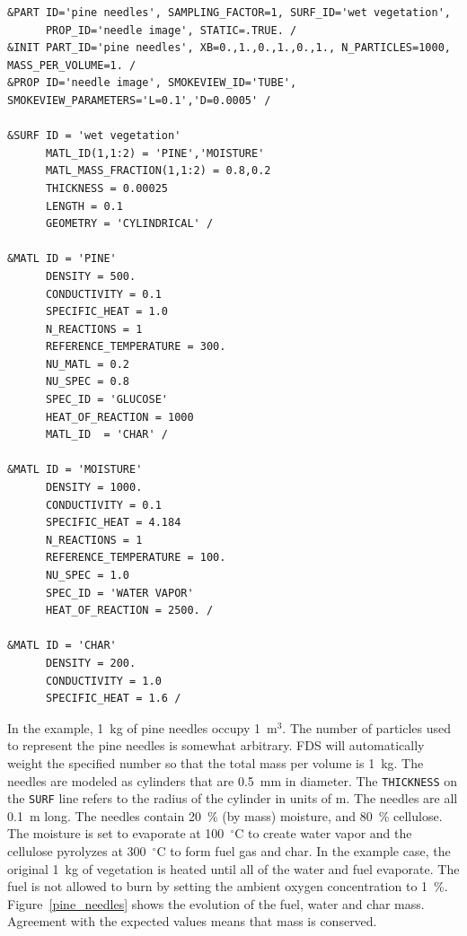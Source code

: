 \documentclass[11pt]{book}
\newcommand{\ct}{\tt\small}
\begin{document}
\footnotesize
\begin{verbatim}
&PART ID='pine needles', SAMPLING_FACTOR=1, SURF_ID='wet vegetation',
      PROP_ID='needle image', STATIC=.TRUE. /
&INIT PART_ID='pine needles', XB=0.,1.,0.,1.,0.,1., N_PARTICLES=1000, MASS_PER_VOLUME=1. /
&PROP ID='needle image', SMOKEVIEW_ID='TUBE', SMOKEVIEW_PARAMETERS='L=0.1','D=0.0005' /

&SURF ID = 'wet vegetation'
      MATL_ID(1,1:2) = 'PINE','MOISTURE'
      MATL_MASS_FRACTION(1,1:2) = 0.8,0.2
      THICKNESS = 0.00025
      LENGTH = 0.1
      GEOMETRY = 'CYLINDRICAL' /

&MATL ID = 'PINE'
      DENSITY = 500.
      CONDUCTIVITY = 0.1
      SPECIFIC_HEAT = 1.0
      N_REACTIONS = 1
      REFERENCE_TEMPERATURE = 300.
      NU_MATL = 0.2
      NU_SPEC = 0.8
      SPEC_ID = 'GLUCOSE'
      HEAT_OF_REACTION = 1000
      MATL_ID  = 'CHAR' /

&MATL ID = 'MOISTURE'
      DENSITY = 1000.
      CONDUCTIVITY = 0.1
      SPECIFIC_HEAT = 4.184
      N_REACTIONS = 1
      REFERENCE_TEMPERATURE = 100.
      NU_SPEC = 1.0
      SPEC_ID = 'WATER VAPOR'
      HEAT_OF_REACTION = 2500. /

&MATL ID = 'CHAR'
      DENSITY = 200.
      CONDUCTIVITY = 1.0
      SPECIFIC_HEAT = 1.6 /
\end{verbatim}
\normalsize

\noindent In the example, 1~kg of pine needles occupy 1~m$^3$. The number of particles used to represent the pine needles is somewhat arbitrary. FDS will automatically weight the specified number so that the total mass per volume is 1~kg. The needles are modeled as cylinders that are 0.5~mm in diameter. The {\ct THICKNESS} on the {\ct SURF} line refers to the radius of the cylinder in units of m. The needles are all 0.1~m long. The needles contain 20~\% (by mass) moisture, and 80~\% cellulose. The moisture is set to evaporate at 100~$^\circ$C to create water vapor and the cellulose pyrolyzes at 300~$^\circ$C to form fuel gas and char. In the example case, the original 1~kg of vegetation is heated until all of the water and fuel evaporate. The fuel is not allowed to burn by setting the ambient oxygen concentration to 1~\%. Figure~\ref{pine_needles} shows the evolution of the fuel, water and char mass. Agreement with the expected values means that mass is conserved.
\end{document}
